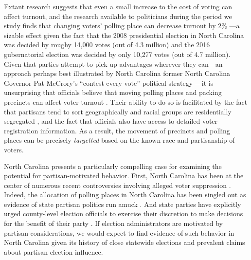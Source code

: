 \documentclass[12pt]{article}
\begin{document}
Extant research suggests that even a small increase to the cost of voting can affect turnout, and the research available to politicians during the period we study finds that changing voters' polling place can decrease turnout by 2\% \citep{brady2011turning}---a sizable effect given the fact that the 2008 presidential election in North Carolina was decided by roughy 14,000 votes (out of 4.3 million) and the 2016 gubernatorial election was decided by only 10,277 votes (out of 4.7 million).  Given that parties attempt to pick up advantages wherever they can---an approach perhaps best illustrated by North Carolina former North Carolina Governor Pat McCrory's ``contest-every-vote'' political strategy \citep{phillips2016}---it is unsurprising that officials believe that moving polling places and packing precincts can affect voter turnout \citep{Phipps:2014ur,Vasilogambros:2018wu}. Their ability to do so is facilitated by the fact that partisans tend to sort geographically and racial groups are residentially segregated \citep{Nall:2015gu,Rothstein:2017vc}, and the fact that officials also have access to detailed voter registration information.  As a result, the movement of precincts and polling places can be precisely \emph{targetted} based on the known race and partisanship of voters.

North Carolina presents a particularly compelling case for examining the potential for partisan-motivated behavior.  First, North Carolina has been at the center of numerous recent controversies involving alleged voter suppression \citep{ap2018, michaelson2016,Stern:2018tr}. Indeed, the allocation of polling places in North Carolina has been singled out as evidence of state partisan politics run amuck \citep{levitsky2018}.  And state parties have explicitly urged county-level election officials to exercise their discretion to make decisions for the benefit of their party \citep{campbell2016c}. If election administrators are motivated by partisan considerations, we would expect to find evidence of such behavior in North Carolina given its history of close statewide elections and prevalent claims about partisan election influence.
\end{document}
